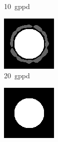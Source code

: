 \begin{figure}[ht]
\begin{subfigure}{0.32\linewidth}
    \caption{\SI{10}{gppd}}
  \end{subfigure}
  \hfill
  \begin{subfigure}{0.32\linewidth}
    \centering
    \includegraphics[width=\linewidth]{images/A4_20gppd.png}
    \caption{\SI{20}{gppd}}
  \end{subfigure}
  \vfill
  \begin{subfigure}{0.32\linewidth}
    \centering
    \includegraphics[width=\linewidth]{images/A4_30gppd.png}

\end{subfigure}
\end{figure}

